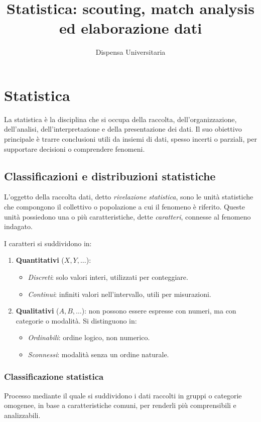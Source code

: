 \documentclass[a4paper,11pt]{article}
\title{\textbf{Statistica: scouting, match analysis ed elaborazione dati}}
\author{Dispensa Universitaria}
\date{}
\begin{document}
\maketitle
\thispagestyle{empty}
\tableofcontents
\newpage

\section{Statistica}
La statistica è la disciplina che si occupa della raccolta, dell'organizzazione, dell'analisi, dell'interpretazione e della presentazione dei dati. Il suo obiettivo principale è trarre conclusioni utili da insiemi di dati, spesso incerti o parziali, per supportare decisioni o comprendere fenomeni.

\subsection{Classificazioni e distribuzioni statistiche}
L'oggetto della raccolta dati, detto \textit{rivelazione statistica}, sono le unità statistiche che compongono il collettivo o popolazione a cui il fenomeno è riferito. Queste unità possiedono una o più caratteristiche, dette \textit{caratteri}, connesse al fenomeno indagato.

I caratteri si suddividono in:
\begin{enumerate}
    \item \textbf{Quantitativi} ($X, Y, \dots$):
    \begin{itemize}
        \item \textit{Discreti}: solo valori interi, utilizzati per conteggiare.
        \item \textit{Continui}: infiniti valori nell'intervallo, utili per misurazioni.
    \end{itemize}
    \item \textbf{Qualitativi} ($A, B, \dots$): non possono essere espresse con numeri, ma con categorie o modalità. Si distinguono in:
    \begin{itemize}
        \item \textit{Ordinabili}: ordine logico, non numerico.
        \item \textit{Sconnessi}: modalità senza un ordine naturale.
    \end{itemize}
\end{enumerate}

\subsubsection{Classificazione statistica}
Processo mediante il quale si suddividono i dati raccolti in gruppi o categorie omogenee, in base a caratteristiche comuni, per renderli più comprensibili e analizzabili.
\end{document}
